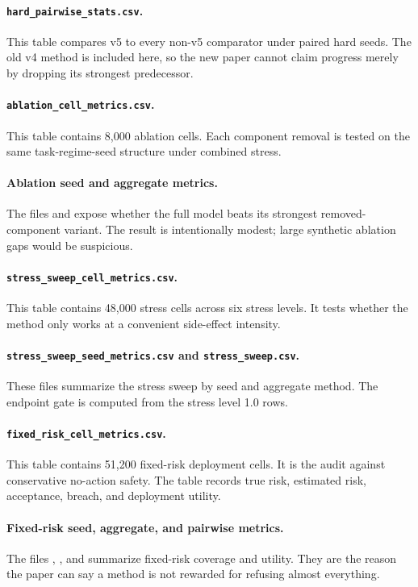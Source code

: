 \documentclass{article}
\begin{document}
\paragraph{\texttt{hard\_pairwise\_stats.csv}.}
This table compares v5 to every non-v5 comparator under paired hard seeds. The old v4 method is included here, so the new paper cannot claim progress merely by dropping its strongest predecessor.

\paragraph{\texttt{ablation\_cell\_metrics.csv}.}
This table contains 8,000 ablation cells. Each component removal is tested on the same task-regime-seed structure under combined stress.

\paragraph{Ablation seed and aggregate metrics.}
The files  and  expose whether the full model beats its strongest removed-component variant. The result is intentionally modest; large synthetic ablation gaps would be suspicious.

\paragraph{\texttt{stress\_sweep\_cell\_metrics.csv}.}
This table contains 48,000 stress cells across six stress levels. It tests whether the method only works at a convenient side-effect intensity.

\paragraph{\texttt{stress\_sweep\_seed\_metrics.csv} and \texttt{stress\_sweep.csv}.}
These files summarize the stress sweep by seed and aggregate method. The endpoint gate is computed from the stress level 1.0 rows.

\paragraph{\texttt{fixed\_risk\_cell\_metrics.csv}.}
This table contains 51,200 fixed-risk deployment cells. It is the audit against conservative no-action safety. The table records true risk, estimated risk, acceptance, breach, and deployment utility.

\paragraph{Fixed-risk seed, aggregate, and pairwise metrics.}
The files , , and  summarize fixed-risk coverage and utility. They are the reason the paper can say a method is not rewarded for refusing almost everything.
\end{document}
